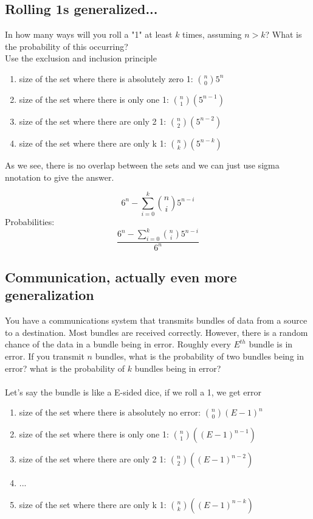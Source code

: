\documentclass[a4paper,12pt]{article}
\begin{document}
\subsection{Rolling 1s generalized...}
In how many ways will you roll a "1" at least $k$ times, assuming $n > k$? 
What is the probability of this occurring?\\
Use the exclusion and inclusion principle
\begin{enumerate}
  \item{size of the set where there is absolutely zero 1: $\binom{n}{0}5^n$}
  \item{size of the set where there is only one 1: $\binom{n}{1}(5^{n-1})$}
  \item{size of the set where there are only 2 1: $\binom{n}{2}(5^{n-2})$} 
  \item{size of the set where there are only k 1: $\binom{n}{k}(5^{n-k})$} 
\end{enumerate}
As we see, there is no overlap between the sets and we can just use sigma nnotation to give the answer.

\[ 6^n - \sum ^k _{i=0} \binom{n}{i}5^{n-i} \]
Probabilities: \\
\[\frac{ 6^n - \sum ^k _{i=0} \binom{n}{i}5^{n-i}} {6^n}\]
\subsection{Communication, actually even more generalization}
You have a communications system that transmits bundles of data
from a source to a destination.  Most bundles are received correctly.
However, there is a random chance of the data in a bundle being in
error.  Roughly every $E^{th}$ bundle is in error.  If you transmit
$n$ bundles, what is the probability of two bundles being
in error?  what is the probability of $k$ bundles being in
error?\\
\bigskip\\
Let's say the bundle is like a E-sided dice, if we roll a 1, we get error
\begin{enumerate}
  \item{size of the set where there is absolutely no error: $\binom{n}{0}(E-1)^n$}
  \item{size of the set where there is only one 1: $\binom{n}{1}((E-1)^{n-1})$}
  \item{size of the set where there are only 2 1: $\binom{n}{2}((E-1)^{n-2})$} 
  \item{...}
  \item{size of the set where there are only k 1: $\binom{n}{k}((E-1)^{n-k})$} 
\end{enumerate}
\end{document}
